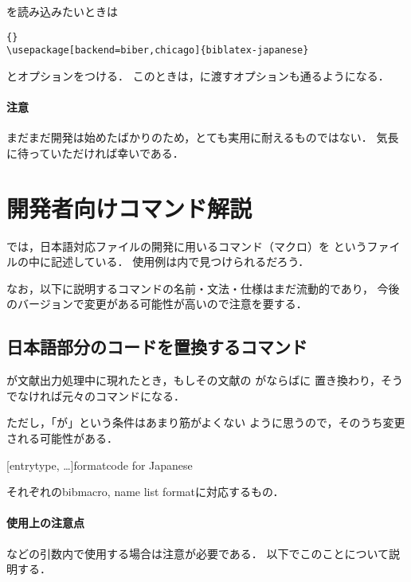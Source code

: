 \documentclass[lualatex,ja=standard,magstyle=real]{bxjsarticle}
\begin{document}
を読み込みたいときは
\begin{lstlisting}[style=latex]{}
\usepackage[backend=biber,chicago]{biblatex-japanese}
\end{lstlisting}
とオプションをつける．
このときは，に渡すオプションも通るようになる．

\paragraph{注意}
まだまだ開発は始めたばかりのため，とても実用に耐えるものではない．
気長に待っていただければ幸いである．

\section{開発者向けコマンド解説}
では，日本語対応ファイルの開発に用いるコマンド（マクロ）を
というファイルの中に記述している．
使用例は内で見つけられるだろう．

なお，以下に説明するコマンドの名前・文法・仕様はまだ流動的であり，
今後のバージョンで変更がある可能性が高いので注意を要する．

\subsection{日本語部分のコードを置換するコマンド}

\begin{ltxsyntax}

  が文献出力処理中に現れたとき，もしその文献の
  がならばに
  置き換わり，そうでなければ元々のコマンドになる．

  ただし，「が」という条件はあまり筋がよくない
  ように思うので，そのうち変更される可能性がある．


  [entrytype, \dots]{format}{code for Japanese}

  それぞれのbibmacro, name list formatに対応するもの．
\end{ltxsyntax}

\paragraph{使用上の注意点}
などの引数内で使用する場合は注意が必要である．
以下でこのことについて説明する．
\end{document}

